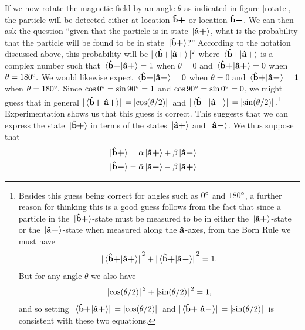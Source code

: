 If we now rotate the magnetic field by an angle $\theta$ as indicated in figure \ref{rotate}, the particle will be detected either at location ${\vb{\hat{{b}}}\bm{+}}$ or location ${\vb{\hat{{b}}}\bm{-}}$. We can then ask the question “given that the particle is in state $\ket*{{\vb{\hat{{a}}}\bm{+}}}$, what is the probability that the particle will be found to be in state $\ket*{{\vb{\hat{{b}}}\bm{+}}}$?” According to the notation discussed above, this probability will be $|\ip*{\uvbp{b}}{\uvbp{a}}|^2$ where $\ip*{\uvbp{b}}{\uvbp{a}}$ is a complex number such that $\ip*{\uvbp{b}}{\uvbp{a}}=1$ when $\theta =0$ and $\ip*{\uvbp{b}}{\uvbp{a}}=0$ when $\theta=180\degree.$ We would likewise expect $\ip*{\uvbp{b}}{\uvbm{a}}=0$ when $\theta =0$ and $\ip*{\uvbp{b}}{\uvbm{a}}=1$ when $\theta=180\degree.$ Since $\cos 0\degree = \sin 90\degree = 1$ and $\cos 90\degree = \sin 0\degree = 0$, we might guess that in general $\abs*{\ip*{\uvbp{b}}{\uvbp{a}}}=\abs*{\cos(\theta/2)}$ and  $\abs*{\ip*{\uvbp{b}}{\uvbm{a}}}=\abs*{\sin(\theta/2)}.$\footnote{Besides this guess being correct for angles such as $0\degree$ and $180\degree$, a further reason for thinking this is a good guess follows from the fact that since a particle in the $\ket*{{\vb{\hat{{b}}}\bm{+}}}$-state must be measured to be  in either the $\ket*{{\vb{\hat{{a}}}\bm{+}}}$-state or the $\ket*{{\vb{\hat{{a}}}\bm{-}}}$-state when measured along the $\vb{\hat{{a}}}$-axes, from the Born Rule we must have 
$$ \abs*{\ip*{\uvbp{b}}{\uvbp{a}}}^2+\abs*{\ip*{\uvbp{b}}{\uvbm{a}}}^2=1.$$
But for any angle $\theta$ we also have 
$$\abs*{\cos(\theta/2)}^2+\abs*{\sin(\theta/2)}^2=1,$$
and so setting $\abs*{\ip*{\uvbp{b}}{\uvbp{a}}}=\abs*{\cos(\theta/2)}$
and  $\abs*{\ip*{\uvbp{b}}{\uvbm{a}}}=\abs*{\sin(\theta/2)}$
is consistent with these two equations.} 
Experimentation shows us that this guess is correct.
This suggests that we can express the state $\ket*{{\vb{\hat{{b}}}\bm{+}}}$ in terms of the states $\ket*{{\vb{\hat{{a}}}\bm{+}}}$ and $\ket*{{\vb{\hat{{a}}}\bm{-}}}$. We thus suppose that 
\begin{subequations}\label{vectoradd}
\begin{align}
\ket*{{\vb{\hat{{b}}}\bm{+}}}&=\alpha\ket*{{\vb{\hat{{a}}}\bm{+}}}+\beta\ket*{{\vb{\hat{{a}}}\bm{-}}}\label{vectoradd1}\\
\ket*{{\vb{\hat{{b}}}\bm{-}}}&=\bar{\alpha}\ket*{{\vb{\hat{{a}}}\bm{-}}}-\bar{\beta}\ket*{{\vb{\hat{{a}}}\bm{+}}}\label{vectoradd2}
\end{align} 
\end{subequations}
